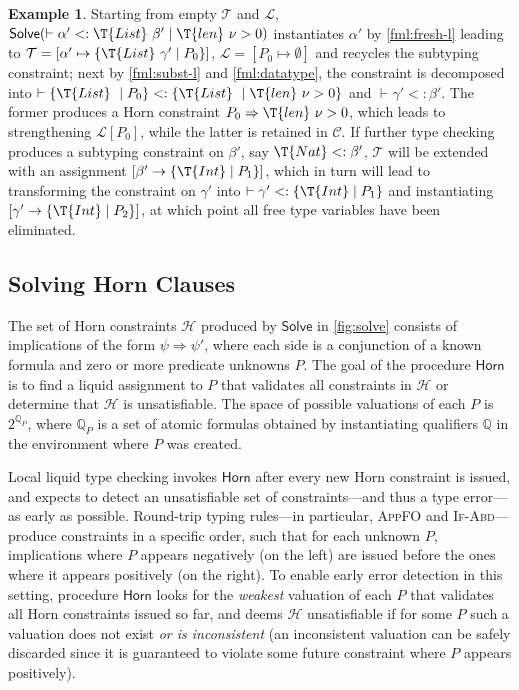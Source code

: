\documentclass[10pt,preprint]{sigplanconf-pldi16}
\theoremstyle{definition}
\newtheorem*{example*}{Example}
\newcommand{\Implies}{\Rightarrow}
\newcommand{\Subt}{<:}
\newcommand{\solve}{\mathsf{Solve}}
\newcommand{\horn}{\mathsf{Horn}}
\newcommand{\quals}{\mathbb{Q}}
\newcommand{\constraints}{\mathcal{C}}
\newcommand{\horns}{\mathcal{H}}
\newcommand{\typeass}{\mathcal{T}}
\newcommand{\liquidass}{\mathcal{L}}
\begin{document}
\begin{example*}
Starting from empty $\typeass$ and $\liquidass$,
$\solve(\vdash \alpha'\Subt \T{List}\ \beta'\mid\T{len}\ \nu > 0)$
instantiates $\alpha'$ by \autoref{fml:fresh-l} leading to $\typeass=[\alpha' \mapsto \{\T{List}\ \gamma'\mid P_0\}]$,
$\liquidass=[P_0\mapsto\emptyset]$ and recycles the subtyping constraint;
next by \autoref{fml:subst-l} and \autoref{fml:datatype}, the constraint is decomposed into
$\vdash \{\T{List}\ \mid P_0\}\Subt \{\T{List}\ \mid\T{len}\ \nu > 0\}$ and $\vdash\gamma' \Subt \beta'$.
The former produces a Horn constraint $P_0\Implies \T{len}\ \nu > 0$, which leads to strengthening $\liquidass[P_0]$,
while the latter is retained in $\constraints$.
If further type checking produces a subtyping constraint on $\beta'$, say $\T{Nat}\Subt\beta'$,
$\typeass$ will be extended with an assignment $[\beta'\to \{\T{Int}\mid P_1\}]$,
which in turn will lead to transforming the constraint on  $\gamma'$ into $\vdash\gamma' \Subt \{\T{Int}\mid P_1\}$
and instantiating $[\gamma'\to \{\T{Int}\mid P_2\}]$,
at which point all free type variables have been eliminated.
\end{example*}





\subsection{Solving Horn Clauses}\label{sec:theory:horn}

The set of Horn constraints $\horns$ produced by $\solve$ in \autoref{fig:solve}
consists of implications of the form $\psi\Implies\psi'$,
where each side is a conjunction of a known formula and zero or more predicate unknowns $P$.
The goal of the procedure $\horn$ is to find a liquid assignment to $P$ that validates all constraints in $\horns$
or determine that $\horns$ is unsatisfiable.
The space of possible valuations of each $P$ is $2^{\quals_P}$,
where $\quals_P$ is a set of atomic formulas
obtained by instantiating qualifiers $\quals$ in the environment where $P$ was created.

Local liquid type checking invokes $\horn$ after every new Horn constraint is issued,
and expects to detect an unsatisfiable set of constraints---and thus a type error---as early as possible.
Round-trip typing rules---in particular, \textsc{AppFO} and \textsc{If-Abd}---produce constraints in a specific order,
such that for each unknown $P$, 
implications where $P$ appears negatively (on the left) are issued before the ones where it appears positively (on the right).
To enable early error detection in this setting,
procedure $\horn$ looks for the \emph{weakest} valuation of each $P$ that validates all Horn constraints issued so far,
and deems $\horns$ unsatisfiable if for some $P$ such a valuation does not exist \emph{or is inconsistent}
(an inconsistent valuation can be safely discarded since it is guaranteed to violate some future constraint where $P$ appears positively).
\end{document}
